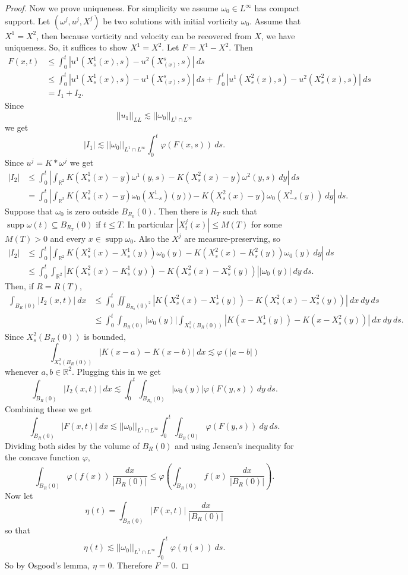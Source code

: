 \documentclass[12pt]{book}
\newcommand{\RR}{\mathbb{R}}
\DeclareMathOperator{\supp}{supp}
\theoremstyle{definition}
\begin{document}
\begin{proof}
Now we prove uniqueness.
For simplicity we assume $\omega_0 \in L^\infty$ has compact support.
Let $(\omega^j, u^j, X^j)$ be two solutions with initial vorticity $\omega_0$.
Assume that $X^1 = X^2$, then because vorticity and velocity can be recovered from $X$, we have uniqueness.
So, it suffices to show $X^1 = X^2$.
Let $F = X^1 - X^2$.
Then
\begin{align*}
F(x, t) &\leq \int_0^t |u^1(X^1_s(x), s) - u^2(X^s_(x), s)| ~ds\\
&\leq \int_0^t |u^1(X^1_s(x), s) - u^1(X^s_(x), s)| ~ds + \int_0^t |u^1(X^2_s(x), s) - u^2(X^2_s(x), s)| ~ds\\
&= I_1 + I_2.
\end{align*}
Since
$$||u_1||_{LL} \lesssim ||\omega_0||_{L^1 \cap L^\infty}$$
we get
$$|I_1| \lesssim ||\omega_0||_{L^1 \cap L^\infty} \int_0^t \varphi(F(x, s)) ~ds.$$
Since $u^j = K * \omega^j$ we get
\begin{align*}
|I_2| &\leq \int_0^t \left|\int_{\RR^2} K(X^1_s(x) - y) \omega^1(y, s) - K(X^2_s(x) - y) \omega^2(y, s) ~dy\right| ~ds\\
&= \int_0^t \left|\int_{\RR^2} K(X^2_s(x) - y) \omega_0(X^1_{-s})(y)) - K(X^2_s(x) - y) \omega_0(X^2_{-s}(y)) ~dy\right| ~ds.
\end{align*}
Suppose that $\omega_0$ is zero outside $B_{R_0}(0)$. Then there is $R_T$ such that $\supp \omega(t) \subseteq B_{R_T}(0)$ if $t \leq T$.
In particular $|X^j_t(x)| \leq M(T)$ for some $M(T) > 0$ and every $x \in \supp \omega_0$.
Also the $X^j$ are measure-preserving, so
\begin{align*}
|I_2| &\leq \int_0^t \left|\int_{\RR^2} K(X^2_s(x) - X^1_s(y))\omega_0(y) - K(X^2_s(x) - K^2_s(y))\omega_0(y) ~dy\right| ~ds\\
&\leq \int_0^t \int_{\RR^2} |K(X^2_s(x) - K^1_s(y)) - K(X^2_s(x) - X^2_s(y))| |\omega_0(y)| ~dy ~ds.
\end{align*}
Then, if $R = R(T)$,
\begin{align*}
\int_{B_R(0)} |I_2(x, t)| ~dx &\leq \int_0^t \iint_{B_{R_0}(0)^2} |K(X^2_s(x) - X^1_s(y)) - K(X^2_s(x) - X^2_s(y))| ~dx ~dy ~ds\\
&\leq \int_0^t \int_{B_R(0)} |\omega_0(y)| \int_{X_s^2(B_R(0))} |K(x - X^1_s(y)) - K(x - X^2_s(y))| ~dx ~dy ~ds.
\end{align*}
Since $X_s^2(B_R(0))$ is bounded,
$$\int_{X_s^2(B_R(0))} |K(x - a) - K(x - b)| ~dx \lesssim \varphi(|a - b|)$$
whenever $a,b \in \RR^2$.
Plugging this in we get
$$\int_{B_R(0)} |I_2(x, t)| ~dx \lesssim \int_0^t \int_{B_{R_0}(0)} |\omega_0(y)| \varphi(F(y, s)) ~dy ~ds.$$
Combining these we get
$$\int_{B_R(0)} |F(x, t)| ~dx \lesssim ||\omega_0||_{L^1 \cap L^\infty} \int_0^t \int_{B_R(0)} \varphi(F(y, s)) ~dy ~ds.$$
Dividing both sides by the volume of $B_R(0)$ and using Jensen's inequality for the concave function $\varphi$,
$$\int_{B_R(0)} \varphi(f(x)) ~\frac{dx}{|B_R(0)|} \leq \varphi\left(\int_{B_R(0)} f(x) ~\frac{dx}{|B_R(0)|}\right).$$
Now let
$$\eta(t) = \int_{B_R(0)} |F(x, t)| ~\frac{dx}{|B_R(0)|}$$
so that
$$\eta(t) \lesssim ||\omega_0||_{L^1 \cap L^\infty} \int_0^t \varphi(\eta(s)) ~ds.$$
So by Osgood's lemma, $\eta = 0$.
Therefore $F = 0$.
\end{proof}
\end{document}
